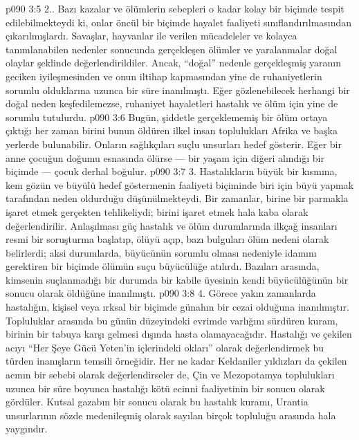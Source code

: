 \vs p090 3:5 2.. Bazı kazalar ve ölümlerin sebepleri o kadar kolay bir biçimde tespit edilebilmekteydi ki, onlar öncül bir biçimde hayalet faaliyeti sınıflandırılmasından çıkarılmışlardı. Savaşlar, hayvanlar ile verilen mücadeleler ve kolayca tanımlanabilen nedenler sonucunda gerçekleşen ölümler ve yaralanmalar doğal olaylar şeklinde değerlendirildiler. Ancak, “doğal” nedenle gerçekleşmiş yaranın geciken iyileşmesinden ve onun iltihap kapmasından yine de ruhaniyetlerin sorumlu olduklarına uzunca bir süre inanılmıştı. Eğer gözlenebilecek herhangi bir doğal neden keşfedilemezse, ruhaniyet hayaletleri hastalık ve ölüm için yine de sorumlu tutulurdu.
\vs p090 3:6 Bugün, şiddetle gerçeklememiş bir ölüm ortaya çıktığı her zaman birini bunun öldüren ilkel insan toplulukları Afrika ve başka yerlerde bulunabilir. Onların sağlıkçıları suçlu unsurları hedef gösterir. Eğer bir anne çocuğun doğumu esnasında ölürse --- bir yaşam için diğeri alındığı bir biçimde --- çocuk derhal boğulur.
\vs p090 3:7 3. Hastalıkların büyük bir kısmına, kem gözün ve büyülü hedef göstermenin faaliyeti biçiminde biri için büyü yapmak tarafından neden oldurduğu düşünülmekteydi. Bir zamanlar, birine bir parmakla işaret etmek gerçekten tehlikeliydi; birini işaret etmek hala kaba olarak değerlendirilir. Anlaşılması güç hastalık ve ölüm durumlarında ilkçağ insanları resmi bir soruşturma başlatıp, ölüyü açıp, bazı bulguları ölüm nedeni olarak belirlerdi; aksi durumlarda, büyücünün sorumlu olması nedeniyle idamını gerektiren bir biçimde ölümün suçu büyücülüğe atılırdı. Bazıları arasında, kimsenin suçlanmadığı bir durumda bir kabile üyesinin kendi büyücülüğünün bir sonucu olarak öldüğüne inanılmıştı.
\vs p090 3:8 4.\bibnobreakspace {} Görece yakın zamanlarda hastalığın, kişisel veya ırksal bir biçimde günahın bir cezai olduğuna inanılmıştır. Topluluklar arasında bu günün düzeyindeki evrimde varlığını sürdüren kuram, birinin bir tabuya karşı gelmesi dışında hasta olamayacağıdır. Hastalığı ve çekilen acıyı “Her Şeye Gücü Yeten’in içlerindeki okları” olarak değerlendirmek bu türden inanışların temsili örneğidir. Her ne kadar Keldaniler yıldızları da çekilen acının bir sebebi olarak değerlendirseler de, Çin ve Mezopotamya toplulukları uzunca bir süre boyunca hastalığı kötü ecinni faaliyetinin bir sonucu olarak gördüler. Kutsal gazabın bir sonucu olarak bu hastalık kuramı, Urantia unsurlarının sözde medenileşmiş olarak sayılan birçok topluluğu arasında hala yaygındır.
